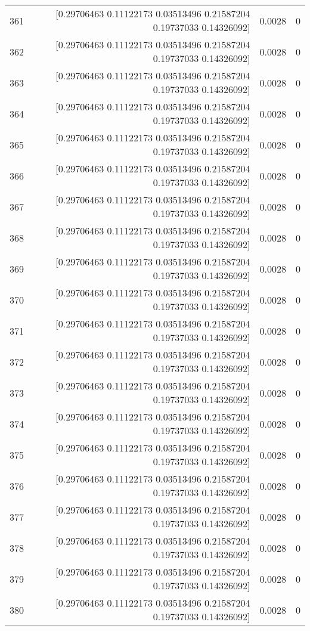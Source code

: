 \begin{longtable}{lrrr}
361 & [0.29706463 0.11122173 0.03513496 0.21587204 0.19737033 0.14326092] & 0.0028 & 0 \\
362 & [0.29706463 0.11122173 0.03513496 0.21587204 0.19737033 0.14326092] & 0.0028 & 0 \\
363 & [0.29706463 0.11122173 0.03513496 0.21587204 0.19737033 0.14326092] & 0.0028 & 0 \\
364 & [0.29706463 0.11122173 0.03513496 0.21587204 0.19737033 0.14326092] & 0.0028 & 0 \\
365 & [0.29706463 0.11122173 0.03513496 0.21587204 0.19737033 0.14326092] & 0.0028 & 0 \\
366 & [0.29706463 0.11122173 0.03513496 0.21587204 0.19737033 0.14326092] & 0.0028 & 0 \\
367 & [0.29706463 0.11122173 0.03513496 0.21587204 0.19737033 0.14326092] & 0.0028 & 0 \\
368 & [0.29706463 0.11122173 0.03513496 0.21587204 0.19737033 0.14326092] & 0.0028 & 0 \\
369 & [0.29706463 0.11122173 0.03513496 0.21587204 0.19737033 0.14326092] & 0.0028 & 0 \\
370 & [0.29706463 0.11122173 0.03513496 0.21587204 0.19737033 0.14326092] & 0.0028 & 0 \\
371 & [0.29706463 0.11122173 0.03513496 0.21587204 0.19737033 0.14326092] & 0.0028 & 0 \\
372 & [0.29706463 0.11122173 0.03513496 0.21587204 0.19737033 0.14326092] & 0.0028 & 0 \\
373 & [0.29706463 0.11122173 0.03513496 0.21587204 0.19737033 0.14326092] & 0.0028 & 0 \\
374 & [0.29706463 0.11122173 0.03513496 0.21587204 0.19737033 0.14326092] & 0.0028 & 0 \\
375 & [0.29706463 0.11122173 0.03513496 0.21587204 0.19737033 0.14326092] & 0.0028 & 0 \\
376 & [0.29706463 0.11122173 0.03513496 0.21587204 0.19737033 0.14326092] & 0.0028 & 0 \\
377 & [0.29706463 0.11122173 0.03513496 0.21587204 0.19737033 0.14326092] & 0.0028 & 0 \\
378 & [0.29706463 0.11122173 0.03513496 0.21587204 0.19737033 0.14326092] & 0.0028 & 0 \\
379 & [0.29706463 0.11122173 0.03513496 0.21587204 0.19737033 0.14326092] & 0.0028 & 0 \\
380 & [0.29706463 0.11122173 0.03513496 0.21587204 0.19737033 0.14326092] & 0.0028 & 0 \\

\end{longtable}
